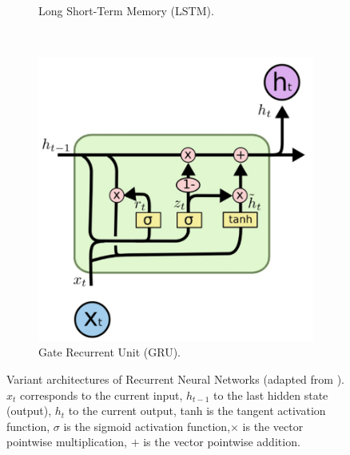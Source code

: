 \begin{figure}[!ht]
\begin{subfigure}[t]{0.45\textwidth}
      \caption{Long Short-Term Memory (LSTM).} \label{fig:lstm}
    \end{subfigure}\\
    \vspace{3em}
    \begin{subfigure}[t]{0.45\textwidth}
      \includegraphics[width=\linewidth]{imgs/models/gru-2.png}
      \caption{Gate Recurrent Unit (GRU).} \label{fig:gru}
    \end{subfigure} 
  \caption{Variant architectures of Recurrent Neural Networks (adapted from \citet{olahUnderstandingLSTMNetworks2015}).  $x_t$ corresponds to the current input, $h_{t-1}$ to the last hidden state (output), $h_t$ to the current output, tanh is the tangent activation function, $\sigma$ is the sigmoid activation function,$\times$ is the vector pointwise multiplication, $+$ is the vector pointwise addition.} \label{fig:recurrent-nn}
\end{figure}

